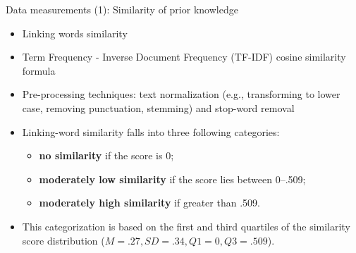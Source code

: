 \begin{frame}[allowframebreaks]{Data measurements (1): Similarity of prior knowledge}
    \begin{itemize}
        \item Linking words similarity
        \item Term Frequency - Inverse Document Frequency (TF-IDF) cosine similarity
              formula 
        \item Pre-processing techniques: text normalization 
              (e.g., transforming to lower case, removing punctuation, stemming) 
              and stop-word removal
        \item Linking-word similarity falls into three following categories: 
        \begin{itemize}
            \item \textbf{no similarity} if the score is 0; 
            \item \textbf{moderately low similarity} if the score lies between 0--.509;
            \item \textbf{moderately high similarity} if greater than .509.
        \end{itemize} 
        \item This categorization is based on the first and third quartiles 
        of the similarity score distribution ($M = .27, SD = .34, Q1 = 0, Q3 = .509$).
    \end{itemize}


\end{frame}

